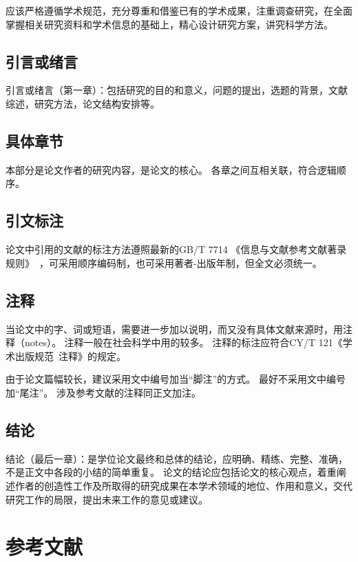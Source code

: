 应该严格遵循学术规范，充分尊重和借鉴已有的学术成果，注重调查研究，在全面掌握相关研究资料和学术信息的基础上，精心设计研究方案，讲究科学方法。

\subsection{引言或绪言}

引言或绪言（第一章）：包括研究的目的和意义，问题的提出，选题的背景，文献综述，研究方法，论文结构安排等。

\subsection{具体章节}

本部分是论文作者的研究内容，是论文的核心。
各章之间互相关联，符合逻辑顺序。

\subsection{引文标注}

论文中引用的文献的标注方法遵照最新的GB/T 7714 《信息与文献参考文献著录规则》~\cite{SCSF00045714}，可采用顺序编码制，也可采用著者-出版年制，但全文必须统一。

\subsection{注释}

当论文中的字、词或短语，需要进一步加以说明，而又没有具体文献来源时，用注释（notes）。
注释一般在社会科学中用的较多。
注释的标注应符合CY/T 121《学术出版规范~注释》的规定。

由于论文篇幅较长，建议采用文中编号加当“脚注”的方式。
最好不采用文中编号加“尾注”。
涉及参考文献的注释同正文加注。

\subsection{结论}

结论（最后一章）：是学位论文最终和总体的结论，应明确、精练、完整、准确，不是正文中各段的小结的简单重复。
论文的结论应包括论文的核心观点，着重阐述作者的创造性工作及所取得的研究成果在本学术领域的地位、作用和意义，交代研究工作的局限，提出未来工作的意见或建议。

\section{参考文献}

